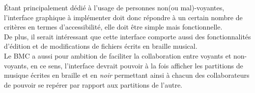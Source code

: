   Étant principalement dédié à l'usage de personnes non(ou mal)-voyantes, l'interface graphique à implémenter doit donc répondre à un certain nombre de critères en termes d'accessibilité, elle doit être simple mais fonctionnelle.\\
  De plus, il serait intéressant que cette interface comporte aussi des fonctionnalités d'édition et de modifications de fichiers écrits en braille musical.\\
   
  Le BMC a aussi pour ambition de faciliter la collaboration entre voyants et non-voyants, en ce sens, l'interface devrait pouvoir à la fois afficher les partitions de musique écrites en braille et en \textit{noir} permettant ainsi à chacun des collaborateurs de pouvoir se repérer par rapport aux partitions de l'autre.    

